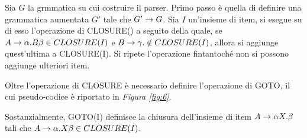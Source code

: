 \documentclass{subfiles}
\begin{document}
Sia $G$ la grmmatica su cui costruire il parser.
Primo passo è quella di definire una grammatica aumentata $G'$ tale che $\Grammar{G'}{G}$.
Sia $I$ un'insieme di item, si esegue su di esso l'operazione di CLOSURE() a seguito della quale,
se $\Grammar{A}{\alpha . B\beta} \in CLOSURE(I)$ e $\Grammar{B}{\gamma .} \notin CLOSURE(I)$, allora si aggiunge quest'ultima a CLOSURE(I).
Si ripete l'operazione fintantoché non si possono aggiunge ulteriori item.

Oltre l'operazione di CLOSURE è necessario definire l'operazione di GOTO, il cui pseudo-codice è riportato in \emph{Figura \ref{fig:6}}.


\noindent Sostanzialmente, GOTO(I) definisce la chiusura dell'insieme di item $\Grammar{A}{\alpha X.\beta}$ tali che $\Grammar{A}{\alpha .X\beta} \in CLOSURE(I)$.
\end{document}
